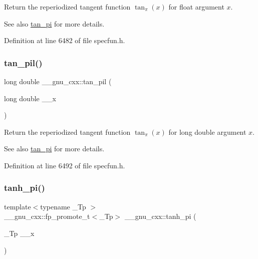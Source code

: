 Return the reperiodized tangent function $ \tan_\pi(x) $ for {\ttfamily float} argument $ x $.

\begin{DoxySeeAlso}{See also}
\hyperlink{group__gnu__math__spec__func_ga12855bd62fe6a955ef0d1d5e92c85ba9}{tan\+\_\+pi} for more details. 
\end{DoxySeeAlso}


Definition at line 6482 of file specfun.\+h.

\mbox{\label{group__gnu__math__spec__func_ga3546906a5bb8f128c893dddef72e2f20}} 
\subsubsection{\texorpdfstring{tan\+\_\+pil()}{tan\_pil()}}
{\footnotesize\ttfamily long double \+\_\+\+\_\+gnu\+\_\+cxx\+::tan\+\_\+pil (\begin{DoxyParamCaption}\item[{long double}]{\+\_\+\+\_\+x }\end{DoxyParamCaption})\hspace{0.3cm}{\ttfamily [inline]}}

Return the reperiodized tangent function $ \tan_\pi(x) $ for {\ttfamily long double} argument $ x $.

\begin{DoxySeeAlso}{See also}
\hyperlink{group__gnu__math__spec__func_ga12855bd62fe6a955ef0d1d5e92c85ba9}{tan\+\_\+pi} for more details. 
\end{DoxySeeAlso}


Definition at line 6492 of file specfun.\+h.

\mbox{\label{group__gnu__math__spec__func_ga8729ffd5acf3266315e9dac1b5a9b3a6}} 
\subsubsection{\texorpdfstring{tanh\+\_\+pi()}{tanh\_pi()}}
{\footnotesize\ttfamily template$<$typename \+\_\+\+Tp $>$ \\
\+\_\+\+\_\+gnu\+\_\+cxx\+::fp\+\_\+promote\+\_\+t$<$\+\_\+\+Tp$>$ \+\_\+\+\_\+gnu\+\_\+cxx\+::tanh\+\_\+pi (\begin{DoxyParamCaption}\item[{\+\_\+\+Tp}]{\+\_\+\+\_\+x }\end{DoxyParamCaption})\hspace{0.3cm}{\ttfamily [inline]}}

